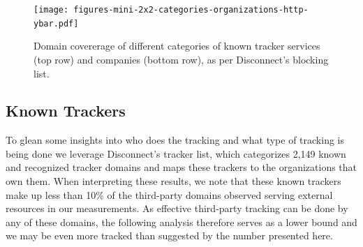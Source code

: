 \documentclass[letterpaper]{sig-alternate-10pt}
\begin{document}
\begin{figure}[t]
\centering
\texttt{[image: figures-mini-2x2-categories-organizations-http-ybar.pdf]}
\vspace{-12pt}
\caption{Domain covererage of different categories of known tracker services (top row)
and companies (bottom row), as per Disconnect's blocking list.}
\label{fig:categories-companies}
\vspace{-12pt}
\end{figure}


\subsection{Known Trackers}

To glean some insights into who does the tracking and what type of
tracking is being done
we leverage Disconnect's tracker list,
which categorizes 2,149 known and recognized tracker domains
and maps these trackers to the organizations that own them.
When interpreting these results, 
we note that 
these known trackers make up less than 10\% of the third-party domains observed
serving external resources in our measurements.
As effective third-party tracking can be done by any of these domains,
the following analysis therefore serves as a lower bound
and we may be even more tracked than suggested by the number presented here.
\end{document}
